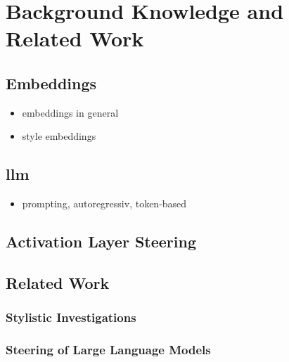 \chapter{Background Knowledge and Related Work}
\label{sec:relatedWork_backgroundKnowledge}
\section{Embeddings}
\label{sec:relatedWork_backgroundKnowledge:embeddings}
\begin{itemize}
  \item embeddings in general
  \item style embeddings
\end{itemize}


\section{\acl{llm}}
\label{sec:relatedWork_backgroundKnowledge:llm}
\begin{itemize}
  \item prompting, autoregressiv, token-based
\end{itemize}


\section{Activation Layer Steering}
\label{sec:relatedWork_backgroundKnowledge:activation}


\section{Related Work}


\subsection{Stylistic Investigations} %


\subsection{Steering of Large Language Models}